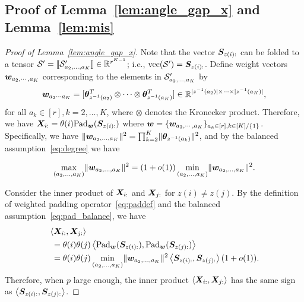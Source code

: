 \documentclass[journal]{IEEEtran}
\theoremstyle{definition}
\theoremstyle{definition}
\newcommand{\ang}[1]{\left\langle#1\right\rangle}
\begin{document}
\subsection{Proof of Lemma~\ref{lem:angle_gap_x} and Lemma~\ref{lem:mis}}

\begin{proof}[Proof of Lemma~\ref{lem:angle_gap_x}] 

Note that the vector $\bm S_{z(i):}$ can be folded to a tensor $\mathcal{S}' =\llbracket \mathcal{S}'_{a_2,\ldots,a_K} \rrbracket \in \mathbb{R}^{r^{K-1}}$; i.e., $\text{vec}(\mathcal{S}') = \bm S_{z(i):}$. Define weight vectors $\bm{w}_{a_2, \cdots, a_K}$ corresponding to the elements in $\mathcal{S}'_{a_2,\ldots,a_K}$ by
\begin{equation}
    \bm{w}_{a_2 \cdots a_K} = [ \boldsymbol{\theta}_{z^{-1} (a_2)}^T \otimes \cdots \otimes \boldsymbol{\theta}_{z^{-1} (a_K)}^T] \in \mathbb{R}^{|z^{-1} (a_2)| \times \cdots \times |z^{-1} (a_K)|},
\end{equation}
for all $a_k \in [r], k = 2,\ldots, K$, where $\otimes$ denotes the Kronecker product. Therefore, we have  $\bm X_{i:} = \theta(i) \text{Pad}_{\bm{w}}(\bm S_{z(i):})$ where $\bm{w} = \{ \bm{w}_{a_2, \cdots, a_K}\}_{a_k \in [r], k\in [K]/\{1\}}$. Specifically, we have $\lVert\bm{w}_{a_2, \ldots, a_K}\rVert^2 = \prod_{k = 2}^K \lVert \boldsymbol{\theta}_{z^{-1}(a_k)}\rVert^2$, and by the balanced assumption~\eqref{eq:degree} we have

\vspace{-0.5cm}
\small
\begin{equation}\label{eq:pad_balance}
    \max_{(a_2,\ldots, a_K)} \onormSize{}{\mw_{a_2,\ldots, a_K}}^2 = (1 + o(1))  \min_{(a_2,\ldots, a_K)} \onormSize{}{\mw_{a_2,\ldots, a_K}}^2.
\end{equation}
\normalsize

Consider the inner product of $\bm X_{i:}$ and $\bm X_{j:}$ for $z(i) \neq z(j)$. By the definition of weighted padding operator~\eqref{eq:paddef} and the balanced assumption~\eqref{eq:pad_balance}, we have 
\begin{align}
    &\ang{\mX_{i:},\mX_{j:}} \\
    &\ = \theta(i) \theta(j) \ang{ \pad_{\mw}(\mS_{z(i):}), \pad_{\mw}(\mS_{z(j):} )}\\
    &\ = \theta(i) \theta(j) \min_{(a_2,\ldots, a_K)} \onormSize{}{\mw_{a_2,\ldots, a_K}}^2 \ang{\mS_{z(i):}, \mS_{z(j):}}(1 + o(1)).
\end{align}
Therefore, when $p$ large enough, the inner product $\ang{\mX_{i:},\mX_{j:}} $ has the same sign as $\ang{\mS_{z(i):}, \mS_{z(j):}}$. 


\end{proof}
\end{document}
